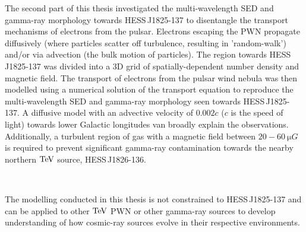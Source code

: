 The second part of this thesis investigated the multi-wavelength SED and gamma-ray morphology towards \mbox{HESS\,J1825-137} to disentangle the transport mechanisms of electrons from the pulsar. Electrons escaping the PWN propagate diffusively (where particles scatter off turbulence, resulting in 'random-walk') and/or via advection (the bulk motion of particles). The region towards \mbox{HESS\,J1825-137} was divided into a 3D grid of spatially-dependent number density and magnetic field. The transport of electrons from the pulsar wind nebula was then modelled using a numerical solution of the transport equation to reproduce the multi-wavelength SED and gamma-ray morphology seen towards \mbox{HESS\,J1825-137}. A diffusive model with an advective velocity of $0.002c$ ($c$ is the speed of light) towards lower Galactic longitudes van broadly explain the observations. Additionally, a turbulent region of gas with a magnetic field between $20-60~\si{\micro G}$ is required to prevent significant gamma-ray contamination towards the nearby northern $\TeV$ source, \mbox{HESS\,J1826-136}.
\par~\par
The modelling conducted in this thesis is not constrained to \mbox{HESS\,J1825-137} and can be applied to other $\TeV$ PWN or other gamma-ray sources to develop understanding of how cosmic-ray sources evolve in their respective environments.
